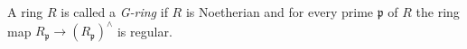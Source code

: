 \begin{definition}
\label{definition-G-ring}
A ring $R$ is called a {\it G-ring} if $R$ is Noetherian and for every
prime $\mathfrak p$ of $R$ the ring map
$R_\mathfrak p \to (R_\mathfrak p)^\wedge$ is regular.
\end{definition}